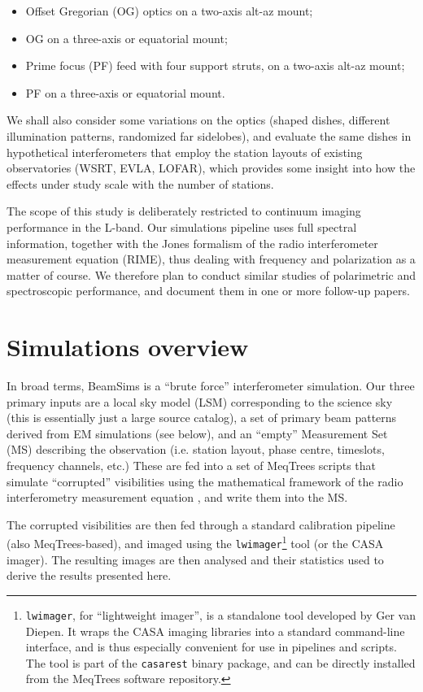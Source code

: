 \documentclass{aa}
\begin{document}
\begin{itemize}
  \item Offset Gregorian (OG) optics on a two-axis alt-az mount;
  \item OG on a three-axis or equatorial mount;
  \item Prime focus (PF) feed with four support struts, on a two-axis alt-az mount;
  \item PF on a three-axis or equatorial mount.
\end{itemize}

We shall also consider some variations on the optics (shaped dishes, different illumination patterns, randomized far sidelobes), and evaluate the same dishes in hypothetical interferometers that employ the station layouts of existing observatories (WSRT, EVLA, LOFAR), which provides some insight into how the effects under study scale with the number of stations.

The scope of this study is deliberately restricted to continuum imaging performance in the L-band. Our simulations pipeline uses full spectral information, together with the Jones formalism of the radio interferometer measurement equation (RIME), thus dealing with frequency and polarization as a matter of course. We therefore plan to conduct similar studies of polarimetric and spectroscopic performance, and document them in one or more follow-up papers.

\section{Simulations overview}

In broad terms, BeamSims is a ``brute force'' interferometer simulation. Our three primary inputs are a local sky model (LSM) corresponding to the science sky (this is essentially just a large source catalog), a set of primary beam patterns derived from EM simulations (see below), and an ``empty'' Measurement Set (MS) describing the observation (i.e. station layout, phase centre, timeslots, frequency channels, etc.) These are fed into a set of MeqTrees \citep{meqtrees} scripts that simulate ``corrupted'' visibilities using the mathematical framework of the radio interferometry measurement equation \citep[RIME; see][]{ME1,RRIME1}, and write them into the MS. 

The corrupted visibilities are then fed through a standard calibration pipeline (also MeqTrees-based), and imaged using the {\tt lwimager}\footnote{{\tt lwimager}, for ``lightweight imager'', is a standalone tool developed by Ger van Diepen. It wraps the CASA imaging libraries into a standard command-line interface, and is thus especially convenient for use in pipelines and scripts. The tool is part of the {\tt casarest} binary package, and can be directly installed from the MeqTrees software repository.} tool (or the CASA imager). The resulting images are then analysed and their statistics used to derive the results presented here.
\end{document}
